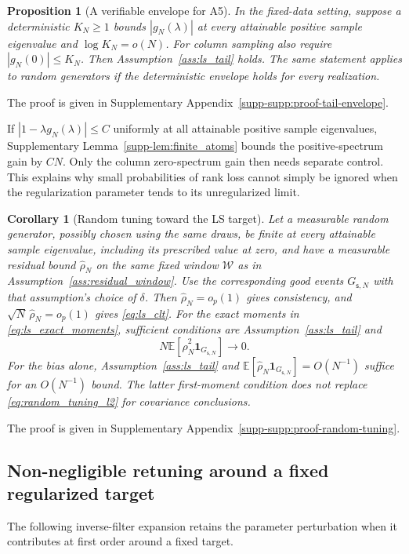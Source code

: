 \documentclass[pdflatex,iicol,sn-mathphys-ay]{sn-jnl}
\theoremstyle{thmstyleone}
\newtheorem{proposition}{Proposition}
\newtheorem{corollary}{Corollary}
\theoremstyle{thmstylethree}
\theoremstyle{thmstyletwo}
\newcommand{\E}{\mathbb E}
\begin{document}
\begin{proposition}[A verifiable envelope for A5]\label{prop:tail_envelope}
In the fixed-data setting, suppose a deterministic $K_N\ge1$ bounds
$|g_N(\lambda)|$ at every attainable positive sample eigenvalue and
$\log K_N=o(N)$. For column sampling also require $|g_N(0)|\le K_N$.
Then Assumption~\ref{ass:ls_tail} holds. The same statement applies to random
generators if the deterministic envelope holds for every realization.
\end{proposition}
The proof is given in Supplementary Appendix~\ref{supp-supp:proof-tail-envelope}.

If $|1-\lambda g_N(\lambda)|\le C$ uniformly at all attainable positive
sample eigenvalues, Supplementary Lemma~\ref{supp-lem:finite_atoms} bounds the positive-spectrum
gain by $CN$. Only the column zero-spectrum gain then needs separate control.
This explains why small probabilities of rank loss cannot simply be ignored
when the regularization parameter tends to its unregularized limit.

\begin{corollary}[Random tuning toward the LS target]\label{cor:random_ls_tuning}
Let a measurable random generator, possibly chosen using the same draws,
be finite at every attainable sample eigenvalue, including its prescribed
value at zero, and have a measurable residual bound $\widehat\rho_N$ on
the same fixed window $\mathcal W$ as in
Assumption~\ref{ass:residual_window}. Use the corresponding good events
$G_{\mathsf{s},N}$ with that assumption's choice of $\delta$.
Then $\widehat\rho_N=o_p(1)$ gives consistency, and
$\sqrt N\,\widehat\rho_N=o_p(1)$ gives \eqref{eq:ls_clt}.
For the exact moments in \eqref{eq:ls_exact_moments}, sufficient conditions are
Assumption~\ref{ass:ls_tail} and
\begin{equation}\label{eq:random_tuning_l2}
 N\E[\widehat\rho_N^2\mathbf{1}_{G_{\mathsf{s},N}}]\longrightarrow0.
\end{equation}
For the bias alone, Assumption~\ref{ass:ls_tail} and
$\E[\widehat\rho_N\mathbf{1}_{G_{\mathsf{s},N}}]=O(N^{-1})$ suffice for an $O(N^{-1})$ bound.
The latter first-moment condition does not replace \eqref{eq:random_tuning_l2}
for covariance conclusions.
\end{corollary}
The proof is given in Supplementary Appendix~\ref{supp-supp:proof-random-tuning}.

\subsection{Non-negligible retuning around a fixed regularized target}
\label{subsec:retuning_fixed_target}
The following inverse-filter expansion retains the parameter perturbation
when it contributes at first order around a fixed target.
\end{document}
